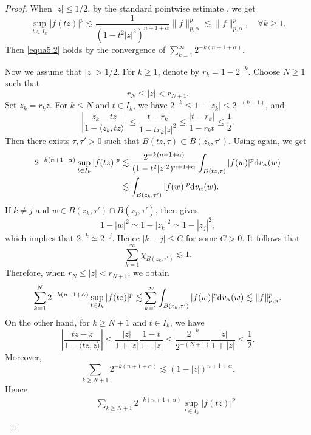 \documentclass[preprint,12pt,times]{elsarticle}
\theoremstyle{definition}
\theoremstyle{remark}
\numberwithin{equation}{section}
\begin{document}
\begin{proof}
When $|z|\leq 1/2$, by the standard pointwise estimate \cite[Theorem 2.1]{Zhu2005}, we get
\begin{equation}\label{equa5.03}
    \sup_{t\in I_k}|f(tz)|^p\lesssim \frac{1}{(1-t^2|z|^2)^{n+1+\alpha}}\|f\|_{p,\alpha}^p\lesssim \|f\|_{p,\alpha}^p,\quad \forall k\geq 1.
\end{equation}
Then \eqref{equa5.2} holds by the convergence of $\sum_{k=1}^{\infty}2^{-k(n+1+\alpha)}$.

Now we assume that $|z|>1/2$. For $k\geq 1$, denote by $r_k=1-2^{-k}$. Choose $N\geq 1$ such that
\[
    r_N\leq |z|<r_{N+1}.
\]
Set $z_k=r_k z$. For $k\leq N$ and $t\in I_k$, we have
$2^{-k}\leq 1-|z_k|\leq 2^{-(k-1)}$, and
\[
    \left|\frac{z_k-tz}{1-\langle z_k, tz\rangle}\right|\leq \frac{|t-r_k|}{1-tr_k|z|^2}\leq \frac{|t-r_k|}{1-r_kt}\leq \frac{1}{2}.
\]
Then there exists $\tau, \tau'>0$ such that $B(tz,\tau)\subset B(z_k,\tau')$. Using \cite[Theorem 2.1]{Zhu2005} again, we get
\begin{align*}
2^{-k(n+1+\alpha)}\sup_{t\in I_k}|f(tz)|^p&\lesssim \frac{2^{-k(n+1+\alpha)}}{(1-t^2|z|^2)^{n+1+\alpha}}\int_{D(tz,\tau)}|f(w)|^p{\rm d}v_{\alpha}(w)\\
&\lesssim \int_{B(z_k,\tau')}|f(w)|^p{\rm d}v_{\alpha}(w).
\end{align*}
If $k\neq j$ and $w\in B(z_k,\tau')\cap B(z_j,\tau')$, then \cite[Lemma 2.20]{Zhu2005} gives
\[
    1-|w|^2\simeq 1-|z_k|^2\simeq 1-|z_j|^2,
\]
which implies that $2^{-k}\simeq 2^{-j}$. Hence $|k-j|\leq C$ for some $C>0$. It follows that
\[
\sum_{k=1}^{\infty}\chi_{B(z_k,\tau')}\lesssim 1.
\]
Therefore, when $r_N\leq |z|<r_{N+1}$, we obtain
\begin{equation}\label{equa5.3}
\sum_{k=1}^{N}2^{-k(n+1+\alpha)}\sup_{t\in I_k}|f(tz)|^p\lesssim \sum_{k=1}^{\infty}\int_{B(z_k,\tau')}|f(w)|^p{\rm d}v_{\alpha}(w)
\lesssim \|f\|_{p,\alpha}^{p}.
\end{equation}
On the other hand, for $k\geq N+1$ and $t\in I_k$, we have
\begin{equation*}
\left|\frac{tz-z}{1-\langle tz,z\rangle}\right|\leq \frac{|z|}{1+|z|}\frac{1-t}{1-|z|}\leq \frac{2^{-k}}{2^{-(N+1)}}\frac{|z|}{1+|z|}\leq \frac{1}{2}.
\end{equation*}
Moreover,
\[
    \sum_{k\geq N+1}2^{-k(n+1+\alpha)}\lesssim (1-|z|)^{n+1+\alpha}.
\]
Hence
\begin{equation}\label{equa5.4}
\begin{split}
&\quad \sum_{k\geq N+1}2^{-k(n+1+\alpha)}\sup_{t\in I_k}|f(tz)|^p\\

\end{split}
\end{equation}
\end{proof}
\end{document}
